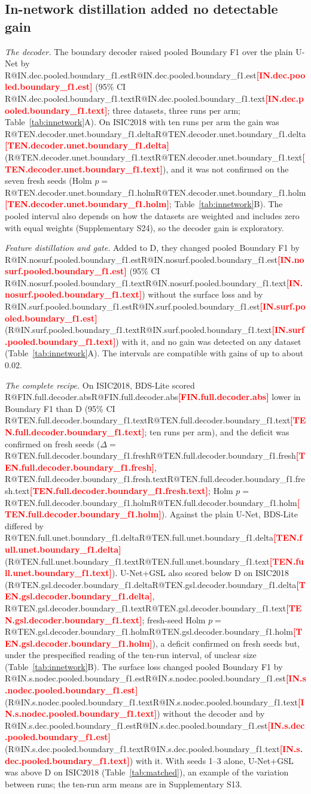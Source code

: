 \documentclass[fleqn,10pt,lineno]{wlpeerj}
\makeatletter
\newcommand{\R}[1]{\ifcsname R@#1\endcsname\csname R@#1\endcsname\else\textbf{\textcolor{red}{[#1]}}\fi}
\makeatother
\begin{document}
\begin{table}[!tb]
\centering
{\small}
\caption{\label{tab:matched}Matched-protocol scores, three runs per arm (seeds 1--3). Upper rows of each dataset: arms of this study, with the reference arm D shaded; lower rows: reference methods. Run means average class-macro scores over test images (ISIC2018) or slices (ACDC, Synapse), excluding classes absent from both prediction and reference. Other metrics, ablation cells and the adapted LB-UNet: Supplementary S6--S7.}
\end{table}

\subsection*{In-network distillation added no detectable gain}
\emph{The decoder.} The boundary decoder raised pooled Boundary F1 over the plain U-Net by \R{IN.dec.pooled.boundary_f1.est} (95\% CI \R{IN.dec.pooled.boundary_f1.text}; three datasets, three runs per arm; Table~\ref{tab:innetwork}A). On ISIC2018 with ten runs per arm the gain was \R{TEN.decoder.unet.boundary_f1.delta} (\R{TEN.decoder.unet.boundary_f1.text}), and it was not confirmed on the seven fresh seeds (Holm $p=$\,\R{TEN.decoder.unet.boundary_f1.holm}; Table~\ref{tab:innetwork}B). The pooled interval also depends on how the datasets are weighted and includes zero with equal weights (Supplementary S24), so the decoder gain is exploratory.

\emph{Feature distillation and gate.} Added to D, they changed pooled Boundary F1 by \R{IN.nosurf.pooled.boundary_f1.est} (95\% CI \R{IN.nosurf.pooled.boundary_f1.text}) without the surface loss and by \R{IN.surf.pooled.boundary_f1.est} (\R{IN.surf.pooled.boundary_f1.text}) with it, and no gain was detected on any dataset (Table~\ref{tab:innetwork}A). The intervals are compatible with gains of up to about 0.02.

\emph{The complete recipe.} On ISIC2018, BDS-Lite scored \R{FIN.full.decoder.abs} lower in Boundary F1 than D (95\% CI \R{TEN.full.decoder.boundary_f1.text}; ten runs per arm), and the deficit was confirmed on fresh seeds ($\Delta=$\,\R{TEN.full.decoder.boundary_f1.fresh}, \R{TEN.full.decoder.boundary_f1.fresh.text}; Holm $p=$\,\R{TEN.full.decoder.boundary_f1.holm}). Against the plain U-Net, BDS-Lite differed by \R{TEN.full.unet.boundary_f1.delta} (\R{TEN.full.unet.boundary_f1.text}). U-Net+GSL also scored below D on ISIC2018 (\R{TEN.gsl.decoder.boundary_f1.delta}, \R{TEN.gsl.decoder.boundary_f1.text}; fresh-seed Holm $p=$\,\R{TEN.gsl.decoder.boundary_f1.holm}), a deficit confirmed on fresh seeds but, under the prespecified reading of the ten-run interval, of unclear size (Table~\ref{tab:innetwork}B). The surface loss changed pooled Boundary F1 by \R{IN.s.nodec.pooled.boundary_f1.est} (\R{IN.s.nodec.pooled.boundary_f1.text}) without the decoder and by \R{IN.s.dec.pooled.boundary_f1.est} (\R{IN.s.dec.pooled.boundary_f1.text}) with it. With seeds 1--3 alone, U-Net+GSL was above D on ISIC2018 (Table~\ref{tab:matched}), an example of the variation between runs; the ten-run arm means are in Supplementary S13.
\end{document}
